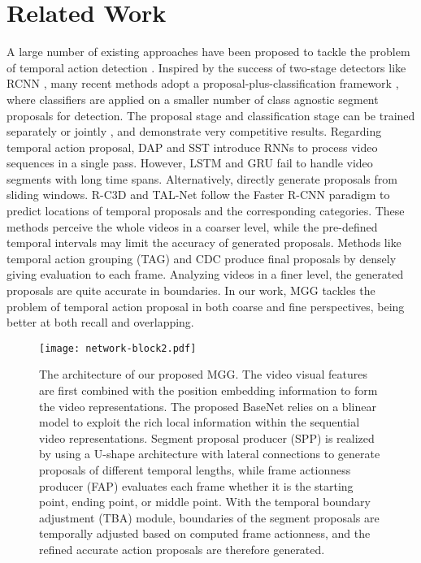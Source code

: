 \documentclass[10pt,twocolumn,letterpaper]{article}
\begin{document}
\section{Related Work}
A large number of existing approaches have been proposed to tackle the problem of temporal action detection \cite{buch2017end,ssn,yeung2016end,ssad,autoloc,lang_model}. Inspired by the success of two-stage detectors like RCNN \cite{rcnn}, many recent methods adopt a proposal-plus-classification framework \cite{r-c3d,re_faster,cdc,tcn}, where classifiers are applied on a smaller number of class agnostic
segment proposals for detection. The proposal stage and classification stage can be trained separately \cite{cdc,shou_action,ssn} or jointly \cite{re_faster,r-c3d}, and demonstrate very competitive results. Regarding temporal action proposal, DAP \cite{dap} and SST
\cite{sst} introduce RNNs to process video sequences in a single
pass. However, LSTM \cite{lstm} and GRU \cite{gru} fail to handle video segments with long
time spans.
Alternatively, \cite{slide_window,tcn,shou_action} directly generate proposals from sliding windows.
R-C3D \cite{r-c3d} and TAL-Net \cite{re_faster} follow the Faster R-CNN \cite{faster_rcnn} paradigm to
predict locations of temporal proposals and the corresponding categories. These methods perceive the whole videos in a coarser level, while the pre-defined temporal intervals may limit the accuracy of generated proposals.
Methods like temporal action grouping (TAG) \cite{TAG} and CDC \cite{cdc} produce final proposals by densely giving evaluation to each frame. Analyzing videos in a finer level,  the generated proposals are quite accurate in boundaries.
In our work, MGG tackles the problem of temporal action proposal in both coarse and fine perspectives, being better at both recall and overlapping.



\begin{figure}
\center
\texttt{[image: network-block2.pdf]}
\caption{The architecture of our proposed MGG. The video visual features are first combined with the position embedding information to form the video representations. The proposed BaseNet relies on a blinear model to exploit the rich local information within the sequential video representations. Segment proposal producer ({SPP}) is realized by using a U-shape architecture with lateral connections to generate proposals of different temporal lengths, while frame actionness producer ({FAP}) evaluates each frame whether it is the starting point, ending point, or middle point. 
With the temporal boundary adjustment (TBA) module, boundaries of the segment proposals are temporally adjusted based on computed frame actionness, and the refined accurate action proposals are therefore generated.} 
\label{network}
\end{figure}
\end{document}
